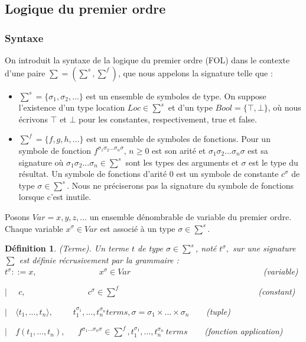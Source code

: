 \documentclass[11pt,openany]{article}
\newtheorem{definition}{D\'efinition}[subsection]
\begin{document}
	\subsection{Logique du premier ordre}
		\subsubsection{Syntaxe}
		On introduit la syntaxe de la logique du premier ordre (FOL) dans le contexte d'une paire $\sum = (\sum^s,\sum^f)$, que nous appelons la signature telle que :
		\begin{itemize}
		\item $\sum^s = \{ \sigma_{1}, \sigma_{2},...\}$ est un ensemble de symboles de type. On suppose l'existence d'un type location $Loc \in \sum^{s}$ et d'un type $Bool = \{ \top , \bot \}$, o\`u nous \'ecrivons $\top$ et $\bot$ pour les constantes, respectivement, true et false.
		\item $\sum^f = \{ f, g, h,...\}$ est un ensemble de symboles de fonctions. Pour un symbole de fonction $f^{\sigma_{1}\sigma_{2}... \sigma_{n}\sigma}$, $n \geq 0$ est son arit\'e et $\sigma_{1}\sigma_{2}... \sigma_{n}\sigma$ est sa signature o\`u $\sigma_{1}\sigma_{2}... \sigma_{n} \in \sum^{s}$ sont les types des arguments et $\sigma$ est le type du r\'esultat. Un symbole de fonctions d'arit\'e 0 est un symbole de constante $c^{\sigma}$ de type $\sigma \in \sum^{s}$. Nous ne pr\'eciserons pas la signature du symbole de fonctions lorsque c'est inutile.
		\end{itemize}

	   Posons $Var = {x,y,z,...}$ un ensemble d\'enombrable de variable du premier ordre. Chaque variable $x^{\sigma} \in Var$ est associ\'e \`a un type $\sigma \in \sum^{s}$.
	   
\begin{definition} (Terme).
Un terme $t$ de type $\sigma \in \sum^{s}$, not\'e $t^{\sigma},$ sur une signature $\sum$ est d\'efinie r\'ecrusivement par la grammaire :\\
$t^{\sigma} ::= x,$ ~~~~~~~~~~~~~~$x^{\sigma} \in Var$ ~~~~~~~~~~~~~~~~~~~~~~~~~~~~~~ (variable) \par
$|$~~ $c,$ ~~~~~~~~~~~~~~$c^{\sigma} \in \sum^{f}$ ~~~~~~~~~~~~~~~~~~~~~~~~~~~~~~~~(constant) \par
$|$~~$\langle t_{1},...,t_{n}\rangle,$~~~~ $t_{1}^{\sigma_{1}},...,t_{n}^{\sigma_{n}} terms, \sigma = \sigma_{1} \times ... \times \sigma_{n}$~~~~(tuple) \par
$|$~~$f(t_{1},...,t_{n}),$~~~$f^{\sigma_{1} ...\sigma_{n} \sigma} \in \sum^{f}, t_{1}^{\sigma_{1}},...,t_{n}^{\sigma_{n}} ~terms$~~~~(fonction application)
\end{definition}
\end{document}
